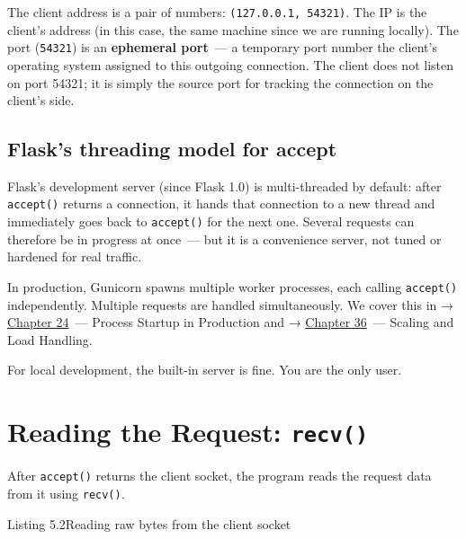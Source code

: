 \noindent{}The client address is a pair of numbers: \texttt{(\textquotesingle{}127.0.0.1\textquotesingle{},}\allowbreak{}\texttt{\ 54321)}. The IP is the client's address (in this case, the same machine since we are running locally). The port (\texttt{54321}) is an \textbf{ephemeral port}~--- a temporary port number the client's operating system assigned to this outgoing connection. The client does not listen on port 54321; it is simply the source port for tracking the connection on the client's side.

\subsection*{Flask's threading model for accept}\label{05-internal-request-execution:flasks-threading-model-for-accept}

Flask's development server (since Flask 1.0) is multi-threaded by default: after \texttt{accept()} returns a connection, it hands that connection to a new thread and immediately goes back to \texttt{accept()} for the next one. Several requests can therefore be in progress at once~--- but it is a convenience server, not tuned or hardened for real traffic.

In production, Gunicorn spawns multiple worker processes, each calling \texttt{accept()} independently. Multiple requests are handled simultaneously. We cover this in → \hyperref[ch:24-process-startup]{Chapter 24}~--- Process Startup in Production and → \hyperref[ch:36-scaling-load]{Chapter 36}~--- Scaling and Load Handling.

For local development, the built-in server is fine. You are the only user.

\setcounter{section}{1}
\section{\texorpdfstring{Reading the Request: \texttt{recv()}}{Reading the Request: recv()}}\label{05-internal-request-execution:52-reading-the-request-recv}

After \texttt{accept()} returns the client socket, the program reads the request data from it using \texttt{recv()}.

\begin{codeboxcap}[short]{\textcolor{accent}{Listing 5.2}\enspace Reading raw bytes from the client socket}

\begin{Shaded}
\begin{Highlighting}[]

\OperatorTok{=}\NormalTok{)}
\end{Highlighting}
\end{Shaded}

\end{codeboxcap}

